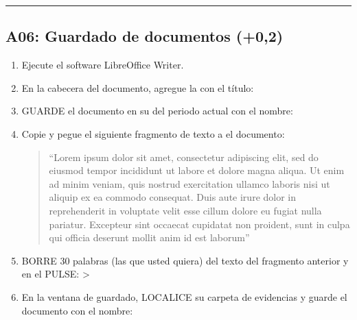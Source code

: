 \documentclass[letterpaper,10pt,spanish]{sphinxmanual}
\begin{document}
\bigskip\hrule\bigskip



\subsection{A06: Guardado de documentos  (+0,2)}
\label{\detokenize{1_guias/10ofimatica/G1013:a06-guardado-de-documentos-301-0-2}}
\sphinxAtStartPar
{}
\begin{enumerate}
%
\item {} 
\sphinxAtStartPar
Ejecute el software LibreOffice Writer.

\item {} 
\sphinxAtStartPar
En la cabecera del documento, agregue la  con el título: 

\item {} 
\sphinxAtStartPar
GUARDE el documento en su  del periodo actual con el nombre: 

\item {} 
\sphinxAtStartPar
Copie y pegue el siguiente fragmento de texto a el documento:
\begin{quote}

\sphinxAtStartPar
“Lorem ipsum dolor sit amet, consectetur adipiscing elit, sed do eiusmod tempor incididunt ut labore et dolore magna aliqua. Ut enim ad minim veniam, quis nostrud exercitation ullamco laboris nisi ut aliquip ex ea commodo consequat. Duis aute irure dolor in reprehenderit in voluptate velit esse cillum dolore eu fugiat nulla pariatur. Excepteur sint occaecat cupidatat non proident, sunt in culpa qui officia deserunt mollit anim id est laborum”
\end{quote}

\item {} 
\sphinxAtStartPar
BORRE 30 palabras (las que usted quiera) del texto del fragmento anterior y en el  PULSE:  > 

\item {} 
\sphinxAtStartPar
En la ventana de guardado, LOCALICE su carpeta de evidencias y guarde el documento con el nombre: 


\end{enumerate}
\end{document}
